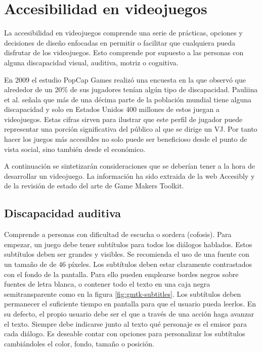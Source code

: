 \section{Accesibilidad en videojuegos}

La accesibilidad en videojuegos comprende una serie de prácticas, opciones y decisiones de diseño enfocadas en permitir o facilitar que cualquiera pueda disfrutar de los videojuegos. Esto comprende por supuesto a las personas con alguna discapacidad visual, auditiva, motriz o cognitiva.

En 2009 el estudio PopCap Games realizó una encuesta en la que observó que alrededor de un 20\% de sus jugadores tenían algún tipo de discapacidad\cite{popcap}. Pauliina et al.\cite{paulina} señala que más de una décima parte de la población mundial tiene alguna discapacidad y solo en Estados Unidos 400 millones de estos juegan a videojuegos. Estas cifras sirven para ilustrar que este perfil de jugador puede representar una porción significativa del público al que se dirige un VJ. Por tanto hacer los juegos más accesibles no solo puede ser beneficioso desde el punto de vista social, sino también desde el económico.

A continuación se sintetizarán consideraciones que se deberían tener a la hora de desarrollar un videojuego. La información ha sido extraida de la web Accesibly\cite{accesibly} y de la revisión de estado del arte de Game Makers Toolkit\cite{gmtk-accesibility}.

\subsection{Discapacidad auditiva}

Comprende a personas con dificultad de escucha o sordera (cofosis). Para empezar, un juego debe tener subtítulos para todos los diálogos hablados. Estos subtítulos deben ser grandes y visibles. Se recomienda el uso de una fuente con un tamaño de de 46 píxeles. Los subtítulos deben estar claramente contrastados con el fondo de la pantalla. Para ello pueden emplearse bordes negros sobre fuentes de letra blanca, o contener todo el texto en una caja negra semitransparente como en la figura \ref{fig:gmtk-subtitles}. Los subtítulos deben permanecer el suficiente tiempo en pantalla para que el usuario pueda leerlos. En su defecto, el propio usuario debe ser el que a través de una acción haga avanzar el texto. Siempre debe indicarse junto al texto qué personaje es el emisor para cada diálogo. Es deseable contar con opciones para personalizar los subtítulos cambiándoles el color, fondo, tamaño o posición.

